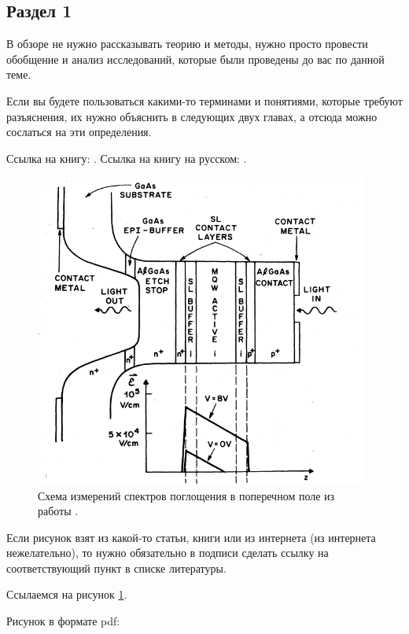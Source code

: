 \documentclass[a4paper,14pt]{extarticle}
\begin{document}
\subsection{Раздел 1}

В обзоре не нужно рассказывать теорию и методы, нужно просто провести обобщение и анализ исследований, которые были проведены до вас по данной теме.

Если вы будете пользоваться какими-то терминами и понятиями, которые требуют разъяснения, их нужно объяснить в следующих двух главах, а отсюда можно сослаться на эти определения.

Ссылка на книгу: \cite{datta1}.
Ссылка на книгу на русском: \cite{fedotkin1}.

\begin{figure}[ht]
\begin{center}
    \includegraphics[width=11cm]{images/Miller2-Figure2.png}
    \caption{\label{fig:miller2-2}
        Схема измерений спектров поглощения в поперечном поле из работы \cite{miller1}.}
\end {center}
\end {figure}
    
Если рисунок взят из какой-то статьи, книги или из интернета (из интернета нежелательно), то нужно обязательно в подписи сделать ссылку на соответствующий пункт в списке литературы.

Ссылаемся на рисунок \ref{fig:miller2-2}.

Рисунок в формате pdf:
\end{document}
